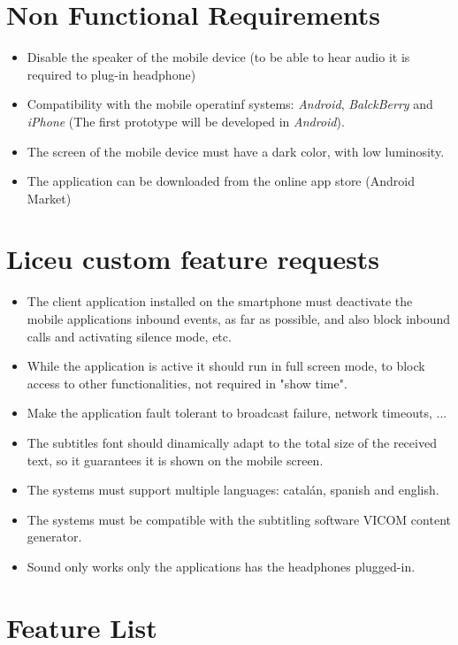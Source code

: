 \documentclass[10pt, oneside, a4paper]{article}
\begin{document}
\section{Non Functional Requirements}
\begin{itemize}
	\item Disable the speaker of the mobile device (to be able to hear audio it is required to plug-in headphone)
	\item Compatibility with the mobile operatinf systems: \emph{Android}, \emph{BalckBerry} and \emph{iPhone} (The first prototype will be developed in \emph{Android}).
	\item The screen of the mobile device must have a dark color, with low luminosity.
	\item The application can be downloaded from the online app store (Android Market)
\end{itemize}

\section{Liceu custom feature requests}
\begin{itemize}
	\item The client application installed on the smartphone must deactivate the mobile applications inbound events, as far as possible, and also block inbound calls and activating silence mode, etc.
	\item While the application is active it should run in full screen mode, to block access to other functionalities, not required in "show time".
	\item Make the application fault tolerant to broadcast failure, network timeouts, ...
	\item The subtitles font should dinamically adapt to the total size of the received text, so it guarantees it is shown on the mobile screen.
	\item The systems must support multiple languages: catalán, spanish and english.
	\item The systems must be compatible with the subtitling software VICOM content generator.
	\item Sound only works only the applications has the headphones plugged-in.
\end{itemize}

\newpage
\section{Feature List}
\end{document}
